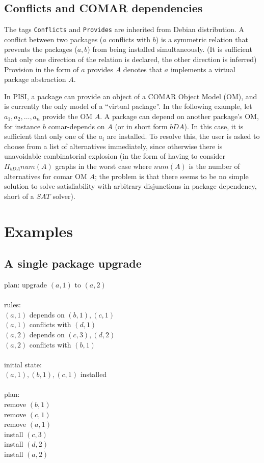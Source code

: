 \documentclass[a4paper,11pt]{article}
\begin{document}
\subsection{Conflicts and COMAR dependencies}

The tags \texttt{Conflicts} and \texttt{Provides} are inherited from
Debian distribution. A conflict between two packages ($a$ conflicts
with $b$) is a symmetric relation that prevents the packages ($a,b$)
from being installed simultaneously. (It is sufficient that only one
direction of the relation is declared, the other direction is
inferred) Provision in the form of $a$ provides $A$ denotes that $a$
implements a virtual package abstraction $A$.

In PISI, a package can provide an object of a COMAR Object Model (OM),
and is currently the only model of a ``virtual package''. In the
following example, let $a_1,a_2,\ldots,a_n$ provide the OM $A$. A package
can depend on another package's OM, for instance $b$ comar-depends on
$A$ (or in short form $bDA$). In this case, it is sufficient that only
one of the $a_i$ are installed. To resolve this, the user is asked to
choose from a list of alternatives immediately, since otherwise there
is unavoidable combinatorial explosion (in the form of having to
consider $\Pi_{bDA}num(A)$ graphs in the worst case where $num(A)$ is
the number of alternatives for comar OM $A$; the problem is that there
seems to be no simple solution to solve satisfiability with arbitrary
disjunctions in package dependency, short of a $SAT$ solver).

\section{Examples}

\subsection{A single package upgrade}

plan: upgrade $(a,1)$ to $(a,2)$\\
\\
rules:\\
  $(a,1)$ depends on $(b,1), (c,1)$ \\
  $(a,1)$ conflicts with $(d,1)$\\
  $(a,2)$ depends on $(c,3), (d,2)$\\
  $(a,2)$ conflicts with $(b,1)$\\
\\
initial state:\\
  $(a,1), (b,1), (c,1)$ installed \\
\\
plan:\\
  remove $(b,1)$\\
  remove $(c,1)$\\
  remove $(a,1)$\\
  install $(c,3)$\\
  install $(d,2)$\\
  install $(a,2)$\\
\end{document}
